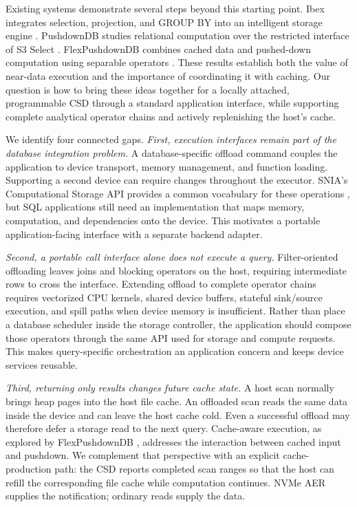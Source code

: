 \documentclass[sigconf, nonacm]{acmart}
\begin{document}
Existing systems demonstrate several steps beyond this starting point.
Ibex integrates selection, projection, and GROUP BY into an intelligent
storage engine \cite{ibex}. PushdownDB studies relational computation over
the restricted interface of S3 Select \cite{pushdowndb}. FlexPushdownDB
combines cached data and pushed-down computation using separable operators
\cite{fpdb}. These results establish both the value of near-data execution
and the importance of coordinating it with caching. Our question is how to
bring these ideas together for a locally attached, programmable CSD through
a standard application interface, while supporting complete analytical
operator chains and actively replenishing the host's cache.

We identify four connected gaps. \emph{First, execution interfaces remain
part of the database integration problem.} A database-specific offload
command couples the application to device transport, memory management, and
function loading. Supporting a second device can require changes throughout
the executor. SNIA's Computational Storage API provides a common vocabulary
for these operations \cite{snia}, but SQL applications still need an
implementation that maps memory, computation, and dependencies onto the device.
This motivates a portable application-facing interface with a separate
backend adapter.

\emph{Second, a portable call interface alone does not execute a query.}
Filter-oriented offloading leaves joins and blocking operators on the host,
requiring intermediate rows to cross the interface. Extending offload to
complete operator chains requires vectorized CPU kernels, shared device
buffers, stateful sink/source execution, and spill paths when device memory
is insufficient. Rather than place a database scheduler inside the storage
controller, the application should compose those operators through the same
API used for storage and compute requests. This makes query-specific
orchestration an application concern and keeps device services reusable.

\emph{Third, returning only results changes future cache state.} A host scan
normally brings heap pages into the host file cache. An offloaded scan reads
the same data inside the device and can leave the host cache cold. Even a
successful offload may therefore defer a storage read to the next query.
Cache-aware execution, as explored by FlexPushdownDB \cite{fpdb}, addresses
the interaction between cached input and pushdown. We complement that
perspective with an explicit cache-production path: the CSD reports completed
scan ranges so that the host can refill the corresponding file cache while
computation continues. NVMe AER supplies the notification; ordinary reads
supply the data.
\end{document}
